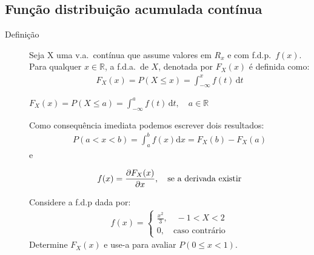      \subsection{Função distribuição acumulada contínua}
     \begin{description}
       \item [Definição] Seja X uma v.a.\ contínua que assume valores em $R_{x}$ e com 
         f.d.p.\ $f(x)$. Para qualquer $x \in \mathbb{R}$, a f.d.a.\ de $X$, denotada por 
         $F_{X}(x)$ é definida como: 
         \begin{align}
           F_{X}(x)= P(X \leq x)= \int_{-\infty}^{x} f(t) \,\mathrm{d}t 
         \end{align}
\begin{obs}$F_{X}(x)= P(X \leq a)= \displaystyle{\int_{-\infty}^{a}f(t) \,\mathrm{d}t}  , \quad a \in \mathbb{R}$\end{obs}

         Como consequência imediata podemos escrever dois resultados: 
         \begin{align}
           P(a <x<b)= \int_{a}^{b} f(x)\mathrm{d}x   = F_{X}(b)-F_{X}(a)
         \end{align}
         e 

         \begin{align}
           f(x)=\frac{\partial F_{X}(x)}{\partial x}, \text{\quad se a derivada existir}
         \end{align}

         \begin{example}Considere a f.d.p dada por: 
           \begin{align*}
             f(x)= 
             \begin{cases}
               \frac{x^2}{3} ,\quad  -1 < X < 2 \\
               0, \quad \text{caso contrário}
             \end{cases}
           \end{align*}
           Determine $F_{X}(x)$ e use-a para avaliar $P(0 \le x< 1)$.


\end{example}
\end{description}
